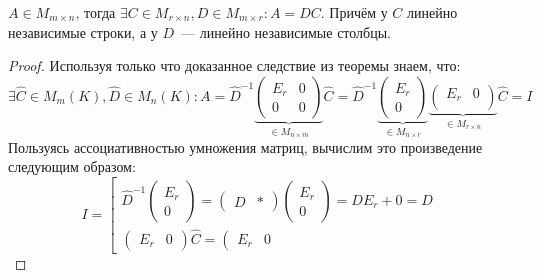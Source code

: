 \begin{statement}
    $A\in M_{m\times n}$, тогда $\exists C\in M_{r\times n},
    D\in M_{m\times r}\colon A = DC$. Причём у $C$ линейно независимые строки,
    а у $D$~--- линейно независимые столбцы.
\end{statement}
\begin{proof}
    Используя только что доказанное следствие из теоремы 
    знаем, что: 
    \[
        \exists \hat{C} \in M_m(K), \hat{D} \in M_n(K)
        \colon A = \hat{D}^{-1}
        \underbrace{\left(\begin{array}{c|c}
                E_r & 0\\
                \hline
                0 & 0
        \end{array}\right)}_{\in M_{n\times m}} \hat{C} 
        = 
        \hat{D}^{-1}
        \underbrace{\left(\begin{array}{c}
                E_r\\
                \hline
                0
        \end{array}\right)}_{\in M_{n\times r}}
        \underbrace{\left(\begin{array}{c|c}
                E_r & 0 \\
        \end{array}\right)}_{\in M_{r\times n}} \hat{C} = I
    \]
    Пользуясь ассоциативностью умножения матриц, вычислим это произведение
    следующим образом:
    \[
    I = 
    \left[
        \begin{gathered}
        \hat{D}^{-1}
        \left(\begin{array}{c}
            E_r\\
            \hline
            0
        \end{array}\right) 
        =
        \left(\begin{array}{c|c}
                D & *
        \end{array}\right)
        \left(\begin{array}{c}
            E_r\\
            \hline
            0
        \end{array}\right)
        =
        D E_r + 0 = D\\
        \left(\begin{array}{c|c}
                E_r & 0
        \end{array}\right) \hat{C}
        =
        \left(\begin{array}{c|c}
                E_r & 0

\end{array}
\end{gathered}\]
\end{proof}
